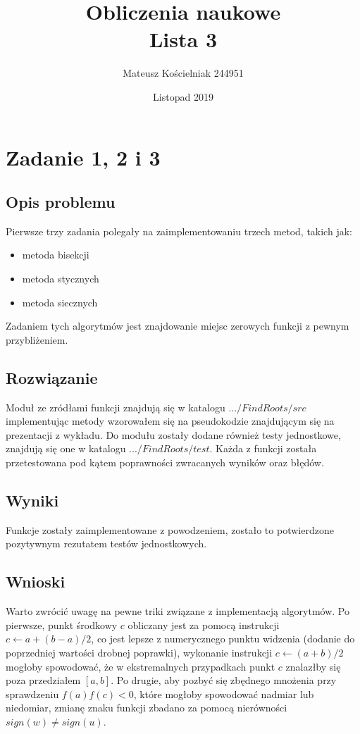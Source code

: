 \documentclass[12pt, a4paper]{article}
\title{\textbf{Obliczenia naukowe\\Lista 3}}
\author{Mateusz Kościelniak 244951\\}
\date{Listopad 2019}
\begin{document}
\maketitle

\newpage

\section{Zadanie 1, 2 i 3}
		
\subsection{Opis problemu}
Pierwsze trzy zadania polegały na zaimplementowaniu trzech metod,  takich jak:
\begin{itemize}  
\item metoda bisekcji 
\item metoda stycznych
\item metoda siecznych 
\end{itemize}
Zadaniem tych algorytmów jest znajdowanie miejsc zerowych funkcji z pewnym przybliżeniem.

\subsection{Rozwiązanie}
Moduł ze zródłami funkcji znajdują się w katalogu $.../FindRoots/src$ implementując metody  wzorowałem się na pseudokodzie znajdującym się na prezentacji z wykładu. Do modułu zostały dodane również testy jednostkowe, znajdują się one w katalogu $.../FindRoots/test$. Każda z funkcji została przetestowana pod kątem poprawności zwracanych wyników oraz błędów. 

\subsection{Wyniki}
Funkcje zostały zaimplementowane z powodzeniem, zostało to potwierdzone pozytywnym rezutatem testów jednostkowych.

\subsection{Wnioski}
Warto zwrócić uwagę  na pewne triki związane z implementacją algorytmów. Po pierwsze, punkt środkowy $c$ obliczany jest za pomocą instrukcji $c \leftarrow a + (b - a)/2$, co jest lepsze z numerycznego punktu widzenia (dodanie do poprzedniej wartości drobnej poprawki), wykonanie instrukcji $c \leftarrow (a + b)/2$ mogłoby spowodować, że w ekstremalnych przypadkach punkt $c$ znalazłby się poza przedziałem $[a, b]$. Po drugie, aby pozbyć się zbędnego mnożenia przy sprawdzeniu $f(a)f(c) < 0$, które mogłoby spowodować nadmiar lub niedomiar, zmianę znaku funkcji zbadano za pomocą nierówności $sign(w) \neq sign(u)$.
\end{document}
